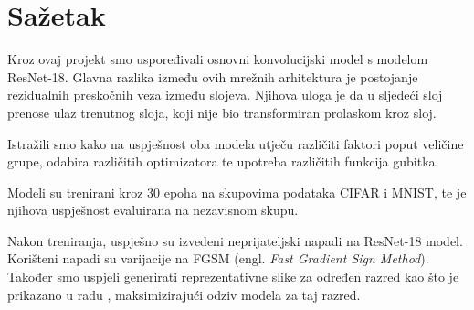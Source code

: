 \chapter{Sažetak}

Kroz ovaj projekt smo uspoređivali osnovni konvolucijski model s modelom ResNet-18. Glavna razlika između ovih mrežnih arhitektura je postojanje rezidualnih preskočnih veza između slojeva. Njihova uloga je da u sljedeći sloj prenose ulaz trenutnog sloja, koji nije bio transformiran prolaskom kroz sloj. 

Istražili smo kako na uspješnost oba modela utječu različiti faktori poput veličine grupe, odabira različitih optimizatora te upotreba različitih funkcija gubitka. 

Modeli su trenirani kroz 30 epoha na skupovima podataka CIFAR i MNIST, te je njihova uspješnost evaluirana na nezavisnom skupu.

Nakon treniranja, uspješno su izvedeni neprijateljski napadi na ResNet-18 model. Korišteni napadi su varijacije na FGSM  (engl. \textit{Fast Gradient Sign Method}). Također smo uspjeli generirati reprezentativne slike za određen razred kao što je prikazano u radu \cite{simonyan2014deep}, maksimizirajući odziv modela za taj razred.